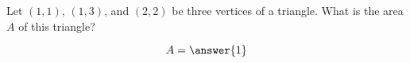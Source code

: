 \documentclass{ximera}
\author{Gregory Hartman \and Matthew Carr}
\begin{document}
\begin{exercise}
Let $(1,1)$, $(1,3)$, and $(2,2)$ be three vertices of a triangle. What is the area $A$ of this triangle?
\begin{prompt}
\[
A=\answer{1}
\]
\end{prompt}


\end{exercise}
\end{document}
